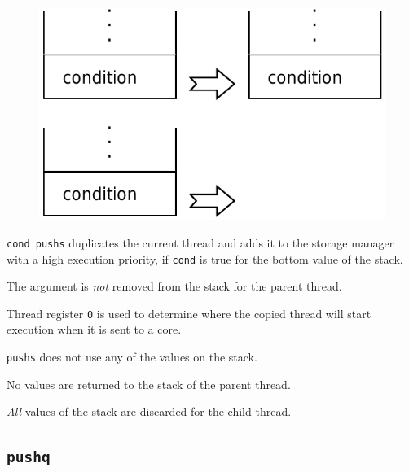 		\begin{figure}
			\begin{flushright}
				\includegraphics[width=\linewidth]{figure/pdf/i_push} 
			\end{flushright}
			\vspace{80pt}
		\end{figure}
	
			\texttt{cond pushs} duplicates the current thread and adds it to
			the storage manager with a high execution priority, if
			\texttt{cond} is true for the bottom value of the stack.

			The argument is \emph{not} removed from the stack for the parent 
			thread.

			Thread register \texttt{0} is used to determine where the copied
			thread will start execution when it is sent to a core.

			\texttt{pushs} does not use any of the values on the stack.
			
			No values are returned to the stack of the parent thread.

			\emph{All} values of the stack are discarded for the child thread.
	
	\qquad

	\subsection*{\texttt{pushq}}
	
